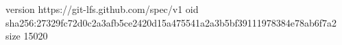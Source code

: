 version https://git-lfs.github.com/spec/v1
oid sha256:27329fc72d0c2a3afb5ce2420d15a475541a2a3b5bf39111978384e78ab6f7a2
size 15020
